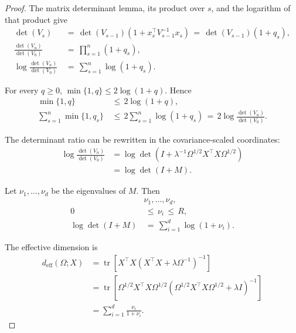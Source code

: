 \documentclass{article} %
\begin{document}
\begin{proof}
The matrix determinant lemma, its product over \(s\), and the logarithm of that
product give
\begin{equation}
\label{eq:hyper-elliptical-proof-logprod}
\begin{aligned}
\det(V_s)
&\,=\,
\det(V_{s-1})
\left(1+x_s^\top V_{s-1}^{-1}x_s\right)
\,=\,
\det(V_{s-1})(1+q_s),
\\
\frac{\det(V_n)}{\det(V_0)}
&\,=\,
\prod_{s=1}^{n}(1+q_s),
\\
\log\frac{\det(V_n)}{\det(V_0)}
&\,=\,
\sum_{s=1}^{n}\log(1+q_s).
\end{aligned}
\end{equation}

For every \(q\geq0\), \(\min\{1,q\}\leq2\log(1+q)\). Hence
\begin{equation}
\label{eq:hyper-elliptical-proof-first}
\begin{aligned}
\min\{1,q\}
&\,\leq\,
2\log(1+q),
\\
\sum_{s=1}^{n}\min\{1,q_s\}
&\,\leq\,
2\sum_{s=1}^{n}\log(1+q_s)
\,=\,
2\log\frac{\det(V_n)}{\det(V_0)}.
\end{aligned}
\end{equation}

The determinant ratio can be rewritten in the covariance-scaled coordinates:
\begin{equation}
\label{eq:hyper-elliptical-proof-scaled-det}
\begin{aligned}
\log\frac{\det(V_n)}{\det(V_0)}
&=
\log
\det
\left(
I+
\lambda^{-1}\Omega^{1/2}X^\top X\Omega^{1/2}
\right)
\\
&=
\log\det(I+M).
\end{aligned}
\end{equation}

Let \(\nu_1,\ldots,\nu_d\) be the eigenvalues of \(M\). Then
\begin{equation}
\label{eq:hyper-elliptical-proof-logdet-eig}
\begin{aligned}
&\nu_1,\ldots,\nu_d,
\\
0
&\,\leq\,
\nu_i
\,\leq\,
R,
\\
\log\det(I+M)
&\,=\,
\sum_{i=1}^{d}\log(1+\nu_i).
\end{aligned}
\end{equation}

The effective dimension is
\begin{equation}
\label{eq:hyper-elliptical-proof-deff-eig}
\begin{aligned}
d_{\mathrm{eff}}(\Omega;X)
&=
\operatorname{tr}
\!\left[
X^\top X
\left(
X^\top X+\lambda\Omega^{-1}
\right)^{-1}
\right]
\\
&=
\operatorname{tr}
\!\left[
\Omega^{1/2}X^\top X\Omega^{1/2}
\left(
\Omega^{1/2}X^\top X\Omega^{1/2}
+
\lambda I
\right)^{-1}
\right]
\\
&=
\sum_{i=1}^{d}
\frac{\nu_i}{1+\nu_i}.
\end{aligned}
\end{equation}


\end{proof}
\end{document}
